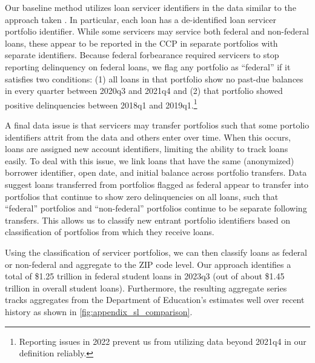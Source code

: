 \documentclass[12pt]{article}
\begin{document}
Our baseline method utilizes loan servicer identifiers in the data similar to the approach taken \citet{GossMangrumScaley2024}.  In particular, each loan has a de-identified loan servicer portfolio identifier. While some servicers may service both federal and non-federal loans, these appear to be reported in the CCP in separate portfolios with separate identifiers.  
Because federal forbearance required servicers to stop reporting delinquency on federal loans, we flag any portfolio as ``federal'' if it satisfies two conditions: (1) all loans in that portfolio show no past-due balances in every quarter between 2020q3 and 2021q4 and (2) that portfolio showed positive delinquencies between 2018q1 and 2019q1.\footnote{Reporting issues in 2022 prevent us from utilizing data beyond 2021q4 in our definition reliably.}  

A final data issue is that servicers may transfer portfolios such that some portolio identifiers attrit from the data and others enter over time. When this occurs, loans are assigned new account identifiers, limiting the ability to track loans easily.  To deal with this issue, we link loans that have the same (anonymized) borrower identifier, open date, and initial balance across portfolio transfers.  Data suggest loans transferred from portfolios flagged as federal appear to transfer into portfolios that continue to show zero delinquencies on all loans, such that ``federal'' portfolios and ``non-federal'' portfolios continue to be separate following transfers.  This allows us to classify new entrant portfolio identifiers based on classification of portfolios from which they receive loans.

Using the classification of servicer portfolios, we can then classify loans as federal or non-federal and aggregate to the ZIP code level. Our approach identifies a total of \$1.25 trillion in federal student loans in 2023q3 (out of about \$1.45 trillion in overall student loans). Furthermore, the resulting aggregate series tracks aggregates from the Department of Education's estimates well over recent history as shown in \cref{fig:appendix_sl_comparison}.
\end{document}

